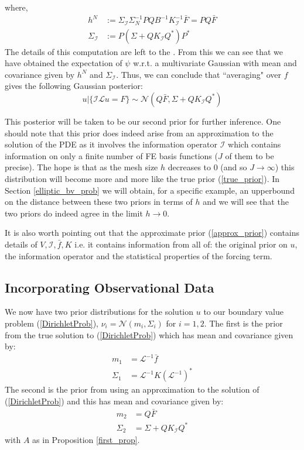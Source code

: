 where,
\begin{align}
    h^{N}&:=\Sigma_{\mathcal{I}}\Sigma_{N}^{-1}PQB^{-1}K_{\mathcal{I}}^{-1}\bar{F}=PQ\bar{F} \\
    \Sigma_{\mathcal{I}}&:=P(\Sigma+QK_{\mathcal{I}}Q^{*})P^{*}
\end{align}
The details of this computation are left to the \textcolor{blue}{}. From this we can see that we have obtained the expectation of $\psi$ w.r.t. a multivariate Gaussian with mean and covariance given by $h^{N}$ and $\Sigma_{\mathcal{I}}$. Thus, we can conclude that ``averaging" over $f$ gives the following Gaussian posterior:
\begin{equation}
    u|\{\mathcal{I}\mathcal{L}u=F\}\sim\mathcal{N}\left(Q\bar{F},\Sigma+QK_{\mathcal{I}}Q^{*}\right)
\end{equation}
\qedsymbol

This posterior will be taken to be our second prior for further inference. One should note that this prior does indeed arise from an approximation to the solution of the PDE as it involves the information operator $\mathcal{I}$ which contains information on only a finite number of FE basis functions ($J$ of them to be precise). The hope is that as the mesh size $h$ decreases to $0$ (and so $J\rightarrow\infty$) this distribution will become more and more like the true prior (\ref{true_prior}). In Section \textcolor{blue}{\ref{elliptic_bv_prob}} we will obtain, for a specific example, an upperbound on the distance between these two priors in terms of $h$ and we will see that the two priors do indeed agree in the limit $h\rightarrow 0$.

It is also worth pointing out that the approximate prior (\ref{approx_prior}) contains details of $V,\mathcal{I},\bar{f},K$ i.e. it contains information from all of: the original prior on $u$, the information operator and the statistical properties of the forcing term.

\subsection{Incorporating Observational Data}
\label{incorporating_obs_data}

We now have two prior distributions for the solution $u$ to our boundary value problem (\ref{DirichletProb}), $\nu_{i}=\mathcal{N}(m_{i},\Sigma_{i})$ for $i=1,2$. The first is the prior from the true solution to (\ref{DirichletProb}) which has mean and covariance given by:
\begin{align}
    m_{1} &= \mathcal{L}^{-1}\bar{f} \\
    \Sigma_{1} &= \mathcal{L}^{-1}K(\mathcal{L}^{-1})^{*}
\end{align}
The second is the prior from using an approximation to the solution of (\ref{DirichletProb}) and this has mean and covariance given by:
\begin{align}
    m_{2} &= Q\bar{F} \\
    \Sigma_{2} &= \Sigma + QK_{\mathcal{I}}Q^{*}
\end{align}
with $A$ as in Proposition \textcolor{blue}{\ref{first_prop}}.

